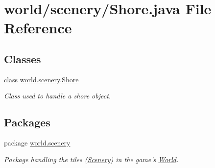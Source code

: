 \hypertarget{a00071}{\section{world/scenery/\-Shore.java File Reference}
\label{a00071}
}
\subsection*{Classes}
\begin{DoxyCompactItemize}
\item 
class \hyperlink{a00025}{world.\-scenery.\-Shore}
\begin{DoxyCompactList}\small\item\em Class used to handle a shore object. \end{DoxyCompactList}\end{DoxyCompactItemize}
\subsection*{Packages}
\begin{DoxyCompactItemize}
\item 
package \hyperlink{a00091}{world.\-scenery}
\begin{DoxyCompactList}\small\item\em Package handling the tiles (\hyperlink{a00024}{Scenery}) in the game's \hyperlink{a00039}{World}. \end{DoxyCompactList}\end{DoxyCompactItemize}
